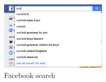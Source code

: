 \begin{figure}[H]
	\centering
	\includegraphics[height=125px]{Images/Design/fb-search}
	\caption{Facebook search}\label{fig:fb-search}		
\end{figure}